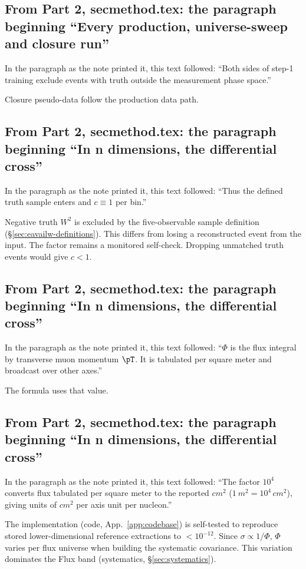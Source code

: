 \subsection{From Part 2, secmethod.tex: the paragraph beginning ``Every production, universe-sweep and closure run''}
In the paragraph as the note printed it, this text followed: ``Both sides of step-1 training exclude events with truth outside the measurement phase space.''\par
Closure pseudo-data follow the production data path.

\subsection{From Part 2, secmethod.tex: the paragraph beginning ``In n dimensions, the differential cross''}
In the paragraph as the note printed it, this text followed: ``Thus the defined truth sample enters and $c\equiv1$ per bin.''\par
Negative truth $W^{2}$ is excluded by the five-observable sample definition (\S\ref{sec:eavailw-definitions}). This differs from losing a reconstructed event from the input. The factor remains a monitored self-check. Dropping unmatched truth events would give $c<1$.

\subsection{From Part 2, secmethod.tex: the paragraph beginning ``In n dimensions, the differential cross''}
In the paragraph as the note printed it, this text followed: ``$\Phi$ is the flux integral by transverse muon momentum $\pT$. It is tabulated per square meter and broadcast over other axes.''\par
The formula uses that value.

\subsection{From Part 2, secmethod.tex: the paragraph beginning ``In n dimensions, the differential cross''}
In the paragraph as the note printed it, this text followed: ``The factor $10^{4}$ converts flux tabulated per square meter to the reported $\si{cm^2}$ ($\SI{1}{m^2}=10^{4}\,\si{cm^2}$), giving units of $\si{cm^2}$ per axis unit per nucleon.''\par
The implementation (code, App.~\ref{app:codebase}) is self-tested to reproduce stored lower-dimensional reference extractions to $<10^{-12}$. Since $\sigma\propto1/\Phi$, $\Phi$ varies per flux universe when building the systematic covariance. This variation dominates the Flux band (systematics, \S\ref{sec:systematics}).

